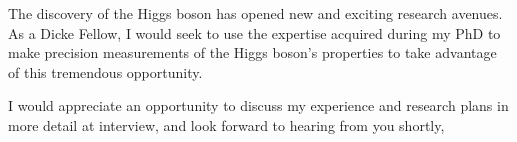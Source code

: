 \documentclass[11pt,a4paper,sans]{moderncv}        %
\begin{document}
The discovery of the Higgs boson has opened new and exciting research avenues. As a Dicke Fellow, I would seek to use the expertise acquired during my PhD to make precision measurements of the Higgs boson's properties to take advantage of this tremendous opportunity.

I would appreciate an opportunity to discuss my experience and research plans in more detail at interview, and look forward to hearing from you shortly,



\makeletterclosing
\end{document}
